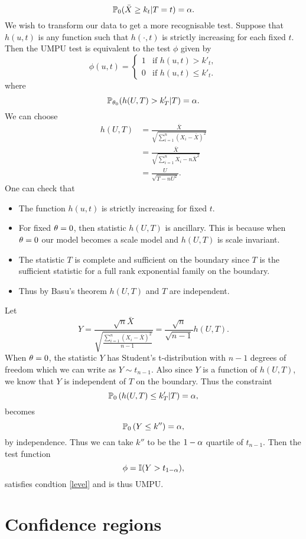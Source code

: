 \begin{equation}\label{level}
    {\mathbb{P}}_{0}(\bar{X} \ge k_{t} | T=t) = {\alpha}.
\end{equation}
We wish to transform our data to get a more recognisable test. Suppose that $h(u,t)$ is any function such that $h(\cdot,t)$ is strictly increasing for each fixed $t$. Then the UMPU test is equivalent to the test $\phi$ given by
\[\phi(u,t) = \begin{cases}
    1 & \text{if } h(u,t) > k'_{t},\\
    0 & \text{if } h(u,t) \le k'_t.
\end{cases} \]
where 
\[{\mathbb{P}}_{{\theta}_0}(h(U,T) > k'_T |T) = {\alpha}.  \]
We can choose 
\begin{align*}
    h(U,T) &= \frac{\bar{X}}{\sqrt{\sum_{i=1}^n\left(X_i-\bar{X}\right)^2}}\\
    &= \frac{\bar{X}}{\sqrt{\sum_{i=1}^n X_i - n\bar{X}^2}}\\
    &= \frac{U}{\sqrt{T-nU^2}}.
\end{align*}
One can check that 
\begin{itemize}
    \item The function $h(u,t)$ is strictly increasing for fixed $t$. 
    \item For fixed ${\theta} = 0$, then statistic $h(U,T)$ is ancillary. This is because when ${\theta}=0$ our model becomes a scale model and $h(U,T)$ is scale invariant. 
    \item The statistic $T$ is complete and sufficient on the boundary since $T$ is the sufficient statistic for a full rank exponential family on the boundary.
    \item Thus by Basu's theorem $h(U,T)$ and $T$ are independent. 
\end{itemize}
Let 
\[Y= \frac{\sqrt{n}\bar{X}}{\sqrt{\frac{\sum_{i=1}^n (X_i-\bar{X})^2}{n-1}}} = \frac{\sqrt{n}}{\sqrt{n-1}} h(U,T). \]
When ${\theta} =0$, the statistic $Y$ has Student's t-distribution with $n-1$ degrees of freedom which we can write as $Y \sim t_{n-1}$. Also since $Y$ is a function of $h(U,T)$, we know that $Y$ is independent of $T$ on the boundary. Thus the constraint
\[{\mathbb{P}}_{0}\left(h(U,T) \le k'_{T}|T\right) ={\alpha}, \]
becomes
\[{\mathbb{P}}_0\left(Y \le k''\right) ={\alpha},\]
by independence. Thus we can take $k''$ to be the $1-{\alpha}$ quartile of $t_{n-1}$. Then the test function 
\[\phi = \mathbb{I}(Y > t_{1-{\alpha}}), \]
satisfies condtion \eqref{level} and is thus UMPU.
\section{Confidence regions}
